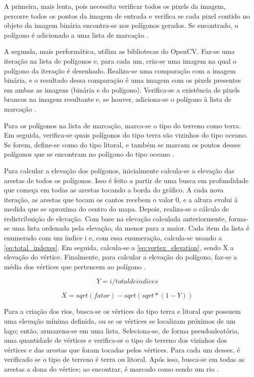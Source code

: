 A primeira, mais lenta, pois necessita verificar todos os pixels da imagem, percorre todos os pontos da imagem de entrada e verifica se cada pixel contido no objeto da imagem binária encontra-se nos polígonos gerados. Se encontrado, o polígono é adicionado a uma lista de marcação \cite{OpenCV}.

A segunda, mais performática, utiliza as bibliotecas do OpenCV. Faz-se uma iteração na lista de polígonos e, para cada um, cria-se uma imagem na qual o polígono da iteração é desenhado. Realiza-se uma comparação com a imagem binária, e o resultado dessa comparação é uma imagem com os pixels presentes em ambas as imagens (binária e do polígono). Verifica-se a existência de pixels brancos na imagem resultante e, se houver, adiciona-se o polígono à lista de marcação \cite{OpenCV}.

Para os polígonos na lista de marcação, marca-se o tipo do terreno como terra. Em seguida, verifica-se quais polígonos do tipo terra são vizinhos do tipo oceano. Se forem, define-se como do tipo litoral, e também se marcam os pontos desses polígonos que se encontram no polígono do tipo oceano \cite{amitp2010,Embarcados}.

Para calcular a elevação dos polígonos, inicialmente calcula-se a elevação das arestas de todos os polígonos. Isso é feito a partir de uma busca em profundidade que começa em todas as arestas tocando a borda do gráfico. A cada nova iteração, as arestas que tocam os cantos recebem o valor 0, e a altura evolui à medida que se aproxima do centro do mapa. Depois, realiza-se o cálculo de redistribuição de elevação. Com base na elevação calculada anteriormente, forma-se uma lista ordenada pela elevação, da menor para a maior. Cada item da lista é enumerado com um índice i e, com essa enumeração, calcula-se usando a \cref{eq:total_indexes}. Em seguida, calcula-se a \cref{eq:vertex_elevation}, sendo X a elevação do vértice. Finalmente, para calcular a elevação do polígono, faz-se a média dos vértices que pertencem ao polígono \cite{amitp2010}.

\begin{equation}
	\label{eq:total_indexes}
	Y = i / total de indices
\end{equation}

\begin{equation}
	\label{eq:vertex_elevation}
	X = sqrt(fator) - sqrt(sqrt * (1 - Y))
\end{equation}

Para a criação dos rios, busca-se os vértices do tipo terra e litoral que possuem uma elevação mínima definida, ou se os vértices se localizam próximos de um lago; então, armazena-se em uma lista. Seleciona-se, de forma pseudoaleatória, uma quantidade de vértices e verifica-se o tipo de terreno dos vizinhos dos vértices e das arestas que foram tocadas pelos vértices. Para cada um desses, é verificado se o tipo de terreno é terra ou litoral. Após isso, busca-se em todas as arestas a dona do vértice; ao encontrar, é marcado como sendo um rio \cite{amitp2010}.

